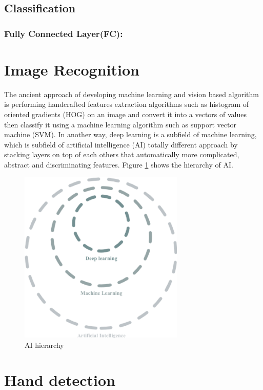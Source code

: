\documentclass[12pt]{report}
\begin{document}
    \subsection{Classification}
        \subsubsection{Fully Connected Layer(FC):}

    
\section{Image Recognition}

    The ancient approach of developing machine learning and vision based algorithm
    is performing handcrafted features extraction algorithms such as histogram of oriented gradients (HOG) on an image
    and convert it into a vectors of values then classify it using a machine learning algorithm such as support vector machine (SVM).
    In another way, deep learning is a subfield of machine learning, which is subfield of artificial intelligence (AI)
    totally different approach by stacking layers on top of each others that automatically more complicated, abstract 
    and discriminating features. Figure \ref{fig:ai_hierarchy} shows the hierarchy of AI.
\bigbreak
\bigbreak
\begin{figure}[h]
    \centering
    \includegraphics[width=0.7\textwidth]{./images/ai_ml_dl.png}
    \caption{AI hierarchy}
    \label{fig:ai_hierarchy}
\end{figure} 

\section{Hand detection}
\end{document}
